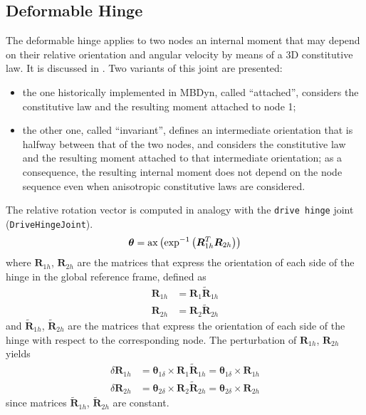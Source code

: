 \documentclass[10pt,fleqn,subeqn]{report}
\newcommand{\T}[1]{\bm{#1}}
\begin{document}
\subsection{Deformable Hinge}
\label{sec:constraints:deformable:deformable hinge}
The deformable hinge applies to two nodes an internal moment that may depend
on their relative orientation and angular velocity by means 
of a 3D constitutive law.
It is discussed in \cite{INVJOINT}.
Two variants of this joint are presented:
\begin{itemize}
\item the one historically implemented in MBDyn, called ``attached'',
considers the constitutive law and the resulting moment attached to node 1;
\item the other one, called ``invariant'', defines an intermediate
orientation that is halfway between that of the two nodes, and considers
the constitutive law and the resulting moment attached to that intermediate
orientation; as a consequence, the resulting internal moment does not depend
on the node sequence even when anisotropic constitutive laws are considered.
\end{itemize}
The relative rotation vector is computed in analogy with the \texttt{drive hinge}
joint (\texttt{DriveHingeJoint}).
\begin{equation}
	\T{\theta} =
	\llk{ax}\plbr{\llk{exp}^{-1}\plbr{\T{R}_{1h}^T \T{R}_{2h}}}
\end{equation}
where $\T{R}_{1h}$, $\T{R}_{2h}$ are the matrices that express
the orientation of each side of the hinge in the global reference frame,
defined as
\begin{subequations}
\begin{align}
	\T{R}_{1h} &= \T{R}_{1} \tilde{\T{R}}_{1h} \\
	\T{R}_{2h} &= \T{R}_{2} \tilde{\T{R}}_{2h}
\end{align}
\end{subequations}
and $\tilde{\T{R}}_{1h}$, $\tilde{\T{R}}_{2h}$ are the matrices
that express the orientation of each side of the hinge with respect
to the corresponding node.
The perturbation of $\T{R}_{1h}$, $\T{R}_{2h}$ yields
\begin{subequations}
\begin{align}
	\delta \T{R}_{1h} &= \T{\theta}_{1\delta} \times \T{R}_{1} \tilde{\T{R}}_{1h}
		= \T{\theta}_{1\delta} \times \T{R}_{1h} \\
	\delta \T{R}_{2h} &= \T{\theta}_{2\delta} \times \T{R}_{2} \tilde{\T{R}}_{2h}
		= \T{\theta}_{2\delta} \times \T{R}_{2h}
\end{align}
\end{subequations}
since matrices $\tilde{\T{R}}_{1h}$, $\tilde{\T{R}}_{2h}$ are constant.
\end{document}
